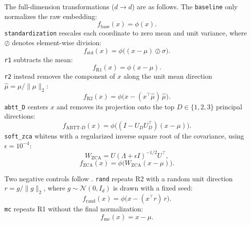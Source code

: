 The full-dimension transformations ($d \to d$) are as follows. The \texttt{baseline} only normalizes the raw embedding:
\begin{equation}
f_{\text{base}}(x) = \phi(x).
\end{equation}
\texttt{standardization} \citep{timkey2021all} rescales each coordinate to zero mean and unit variance, where $\oslash$ denotes element-wise division:
\begin{equation}
f_{\text{std}}(x) = \phi\big((x - \mu) \oslash \sigma\big).
\end{equation}
\texttt{r1} \citep{ren2025correcting} subtracts the mean:
\begin{equation}
f_{\text{R1}}(x) = \phi(x - \mu).
\end{equation}
\texttt{r2} \citep{ren2025correcting} instead removes the component of $x$ along the unit mean direction $\hat{\mu} = \mu / \|\mu\|_2$:
\begin{equation}
f_{\text{R2}}(x) = \phi\big(x - (x^\top \hat{\mu})\, \hat{\mu}\big).
\end{equation}
\texttt{abtt\_D} \citep{mu2018all} centers $x$ and removes its projection onto the top $D \in \{1, 2, 3\}$ principal directions:
\begin{equation}
f_{\text{ABTT-}D}(x) = \phi\big((I - U_D U_D^\top)(x - \mu)\big).
\end{equation}
\texttt{soft\_zca} \citep{diera2024isotropy} whitens with a regularized inverse square root of the covariance, using $\epsilon = 10^{-4}$:
\begin{equation}
W_{\text{ZCA}} = U (\Lambda + \epsilon I)^{-1/2} U^\top,
\end{equation}
\begin{equation}
f_{\text{ZCA}}(x) = \phi\big(W_{\text{ZCA}} (x - \mu)\big).
\end{equation}

Two negative controls follow \citet{ren2025correcting}. \texttt{rand} repeats R2 with a random unit direction $r = g / \|g\|_2$, where $g \sim \mathcal{N}(0, I_d)$ is drawn with a fixed seed:
\begin{equation}
f_{\text{rand}}(x) = \phi\big(x - (x^\top r)\, r\big).
\end{equation}
\texttt{mc} repeats R1 without the final normalization:
\begin{equation}
f_{\text{mc}}(x) = x - \mu.
\end{equation}

